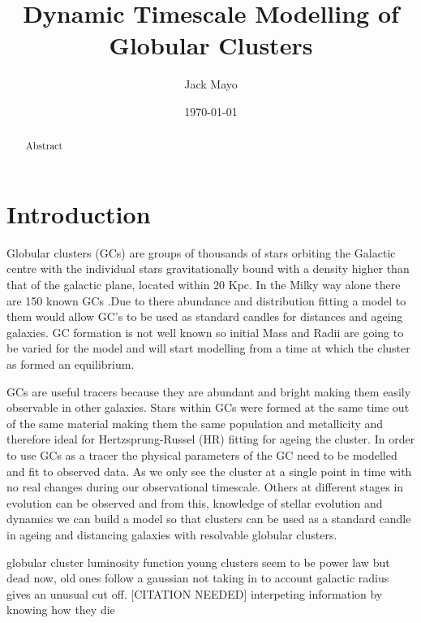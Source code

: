 \documentclass[%
 aip,
 jmp,%
 amsmath,amssymb,
 reprint,%
]{revtex4-1}
\begin{document}


\title[PHY319]{Dynamic Timescale Modelling of Globular Clusters}%


\author{Jack Mayo}
 

\date{\today}%

\begin{abstract}
Abstract \end{abstract}


\maketitle


\section{\label{sec:level1}Introduction}
Globular clusters (GCs) are groups of thousands of stars orbiting the Galactic centre with the individual stars gravitationally bound with a density higher than that of the galactic plane, located within 20 Kpc. In the Milky way alone there are 150 known GCs \cite{Harris1996}.Due to there abundance and distribution fitting a model to them would allow GC's to be used as standard candles for distances and ageing galaxies. GC formation is not well known so initial Mass and Radii are going to be varied for the model and will start modelling from a time at which the cluster as formed an equilibrium.  

GCs are useful tracers because they are abundant and bright making them easily observable in other galaxies. Stars within GCs were formed at the same time out of the same material making them the same population and metallicity and therefore ideal for Hertzsprung-Russel (HR) fitting for ageing the cluster. In order to use GCs as a tracer the physical parameters of the GC need to be modelled and fit to observed data. As we only see the cluster at a single point in time with no real changes during our observational timescale. Others at different stages in evolution can be observed and from this, knowledge of stellar evolution and dynamics we can build a model so that clusters can be used as a standard candle in ageing and distancing galaxies with resolvable globular clusters.%

globular cluster luminosity function
young clusters seem to be power law but dead now, old ones follow a gaussian not taking in to account galactic radius gives an unusual cut off. [CITATION NEEDED]
interpeting information by knowing how they die 
\end{document}
